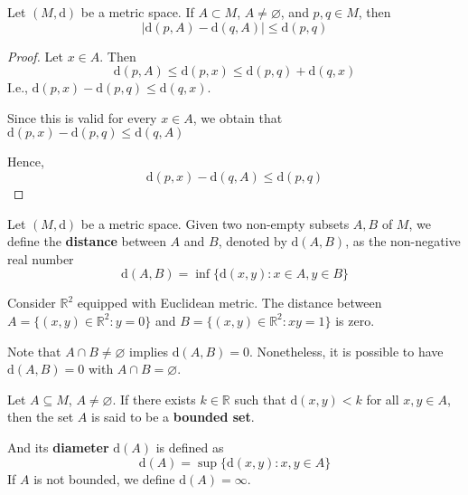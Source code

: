 \begin{proposition}
	Let $(M,\mathrm{d})$ be a metric space. If $A \subset M$, $A \neq \varnothing$, and $p, q \in M$, then
	\begin{equation*}
		| \mathrm{d}(p, A) - \mathrm{d}(q, A) | \leq \mathrm{d}(p,q)
	\end{equation*}
\end{proposition}

\begin{proof}
	Let $x \in A$. Then
	\[
		\mathrm{d}(p,A) \leq \mathrm{d}(p,x) \leq \mathrm{d}(p,q) + \mathrm{d}(q,x)
	\]
	I.e., $\mathrm{d}(p,x) - \mathrm{d}(p,q) \leq \mathrm{d}(q,x)$.
	
	Since this is valid for every $x \in A$, we obtain that $\mathrm{d}(p,x) - \mathrm{d}(p,q) \leq \mathrm{d}(q,A)$
	
	Hence,
	\[
		\mathrm{d}(p,x) - \mathrm{d}(q,A) \leq \mathrm{d}(p,q)
	\]
\end{proof}

\begin{definition}
	Let $(M,\mathrm{d})$ be a metric space. Given two non-empty subsets $A, B$ of $M$, we define the \textbf{distance} between $A$ and $B$, denoted by $\mathrm{d}(A, B)$, as the non-negative real number
	\begin{equation*}
		\mathrm{d}(A,B) = \inf \{ \mathrm{d}(x,y) : x \in A, y \in B \}
	\end{equation*}
\end{definition}

\begin{example}
	Consider $\mathbb{R}^2$ equipped with Euclidean metric. The distance between $A = \{ (x,y) \in \mathbb{R}^2 : y = 0 \}$ and $B = \{ (x,y) \in \mathbb{R}^2 : xy = 1 \}$ is zero.
	
	Note that $A \cap B \neq \varnothing$ implies $\mathrm{d}(A,B) = 0$. Nonetheless, it is possible to have $\mathrm{d}(A,B) = 0$ with $A \cap B = \varnothing$.
\end{example}

\begin{definition}
	Let $A \subseteq M$, $A \neq \varnothing$. If there exists $k \in \mathbb{R}$ such that $\mathrm{d}(x,y) < k$ for all $x, y \in A$, then the set $A$ is said to be a \textbf{bounded set}.
	
	And its \textbf{diameter} $\mathrm{d}(A)$ is defined as
	\[
		\mathrm{d}(A) = \sup \{ \mathrm{d}(x,y) : x,y \in A \}
	\]
	If $A$ is not bounded, we define $\mathrm{d}(A) = \infty$.
\end{definition}

